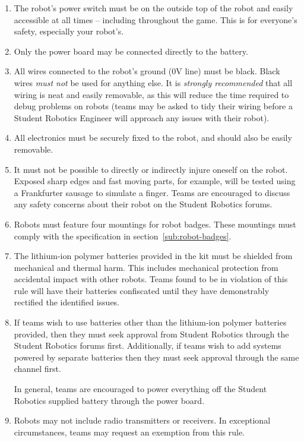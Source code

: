 \begin{enumerate}
\item The robot's power switch must be on the outside top of the robot and easily accessible at all times -- including throughout the game.
      This is for everyone's safety, especially your robot's.

\item Only the power board may be connected directly to the battery.

\item All wires connected to the robot's ground (0V line) must be black.
      Black wires \emph{must not} be used for anything else.
      It is \emph{strongly recommended} that all wiring is neat and easily removable, as this will reduce the time required to debug problems on robots
       (teams may be asked to tidy their wiring before a Student Robotics Engineer will approach any issues with their robot).

\item All electronics must be securely fixed to the robot, and should also be easily removable.

\item It must not be possible to directly or indirectly injure oneself on the robot.
      Exposed sharp edges and fast moving parts, for example, will be tested using a Frankfurter sausage to simulate a finger.
      Teams are encouraged to discuss any safety concerns about their robot on the Student Robotics forums.

\item Robots must feature four mountings for robot badges.
      These mountings must comply with the specification in section~\ref{sub:robot-badges}.

\item The lithium-ion polymer batteries provided in the kit must be shielded from mechanical and thermal harm.
      This includes mechanical protection from accidental impact with other robots.
      Teams found to be in violation of this rule will have their batteries confiscated until they have demonstrably rectified the identified issues.

\item If teams wish to use batteries other than the lithium-ion polymer batteries provided,
       then they must seek approval from Student Robotics through the Student Robotics forums first.
      Additionally, if teams wish to add systems powered by separate batteries then they must seek approval through the same channel first.

      In general, teams are encouraged to power everything off the Student Robotics supplied battery through the power board.

\item Robots may not include radio transmitters or receivers.
      In exceptional circumstances, teams may request an exemption from this rule.

\end{enumerate}
